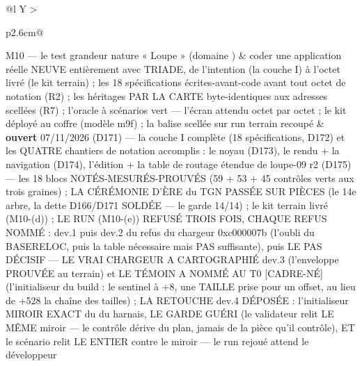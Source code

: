 \begin{table}[htbp]
\begin{tabularx}{\textwidth}{@{}l Y >{\raggedright\arraybackslash}p{2.6cm}@{}}
M10 — le test grandeur nature « Loupe » (domaine ) & coder une application réelle NEUVE entièrement avec TRIADE, de l'intention (la couche I) à l'octet livré (le kit terrain) ; les 18 spécifications écrites-avant-code avant tout octet de notation (R2) ; les héritages PAR LA CARTE byte-identiques aux adresses scellées (R7) ; l'oracle à scénarios vert — l'écran attendu octet par octet ; le kit déployé au coffre  (modèle m9f) ; la balise  scellée sur run terrain recoupé & \textbf{ouvert} 07/11/2026 (D171) — la couche I complète (18 spécifications, D172) et les QUATRE chantiers de notation accomplis : le noyau (D173), le rendu + la navigation (D174), l'édition + la table de routage étendue de loupe-09 r2 (D175) — les 18 blocs NOTÉS-MESURÉS-PROUVÉS (59 + 53 + 45 contrôles verts aux trois graines) ; LA CÉRÉMONIE D'ÈRE du TGN PASSÉE SUR PIÈCES (le 14e arbre, la dette D166/D171 SOLDÉE — le garde 14/14) ; le kit terrain livré (M10-(d)) ; LE RUN (M10-(e)) REFUSÉ TROIS FOIS, CHAQUE REFUS NOMMÉ : dev.1 puis dev.2 du refus du chargeur 0xc000007b (l'oubli du BASERELOC, puis la table nécessaire mais PAS suffisante), puis LE PAS DÉCISIF — LE VRAI CHARGEUR A CARTOGRAPHIÉ dev.3 (l'enveloppe PROUVÉE au terrain) et LE TÉMOIN A NOMMÉ AU T0 [CADRE-NÉ] (l'initialiseur du build : le sentinel à +8, une TAILLE prise pour un offset, au lieu de +528 la chaîne des tailles) ; LA RETOUCHE dev.4 DÉPOSÉE : l'initialiseur  MIROIR EXACT du  du harnais, LE GARDE GUÉRI (le validateur relit LE MÊME miroir — le contrôle dérive du plan, jamais de la pièce qu'il contrôle), ET le scénario relit LE  ENTIER contre le miroir — le run rejoué attend le développeur \\
\bottomrule
\end{tabularx}
\end{table}

